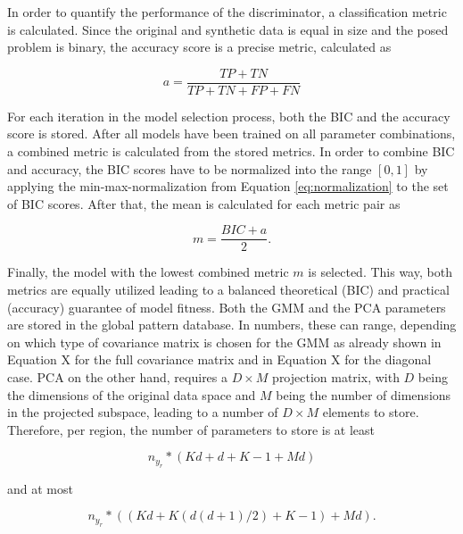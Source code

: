  In order to quantify the performance of the discriminator, a classification metric is calculated. Since the original and synthetic data is equal in size and the posed problem is binary, the accuracy score is a precise metric, calculated as

 \begin{equation}
    a = \frac{TP + TN}{TP + TN + FP + FN}
 \end{equation}

 For each iteration in the model selection process, both the BIC and the accuracy score is stored. After all models have been trained on all parameter combinations, a combined metric is calculated from the stored metrics. In order to combine BIC and accuracy, the BIC scores have to be normalized into the range $[0, 1]$ by applying the min-max-normalization from Equation \ref{eq:normalization} to the set of BIC scores. After that, the mean is calculated for each metric pair as
 
 \begin{equation}
    m = \frac{BIC + a}{2}.
 \end{equation}

 Finally, the model with the lowest combined metric $m$ is selected. This way, both metrics are equally utilized leading to a balanced theoretical (BIC) and practical (accuracy) guarantee of model fitness. Both the GMM and the PCA parameters are stored in the global pattern database. In numbers, these can range, depending on which type of covariance matrix is chosen for the GMM as already shown in Equation X for the full covariance matrix and in Equation X for the diagonal case. PCA on the other hand, requires a $D \times M$ projection matrix, with $D$ being the dimensions of the original data space and $M$ being the number of dimensions in the projected subspace, leading to a number of $D \times M$ elements to store. Therefore, per region, the number of parameters to store is at least
 
 \begin{equation}
    n_{y_r} * ( Kd + d +K-1 + Md  )
 \end{equation}

 and at most

 \begin{equation}
    n_{y_r} * ((Kd + K(d(d+1)/2)+K-1) + Md  ).
 \end{equation}



